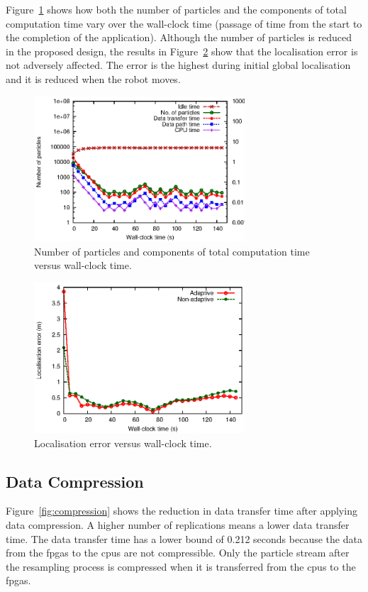 Figure~\ref{fig:adaptive} shows how both the number of particles and the components of total computation time vary over the wall-clock time (passage of time from the start to the completion of the application).
Although the number of particles is reduced in the proposed design, the results in Figure~\ref{fig:error} show that the localisation error is not adversely affected.
The error is the highest during initial global localisation and it is reduced when the robot moves.

\begin{figure}[t!]
\centering
\includegraphics[width=0.7\textwidth]{4_adaptation/figures/fig_adaptive}
\caption{Number of particles and components of total computation time versus wall-clock time.}
\label{fig:adaptive}
\end{figure}

\begin{figure}[t!]
\centering
\includegraphics[width=0.7\textwidth]{4_adaptation/figures/fig_error}
\caption{Localisation error versus wall-clock time.}
\label{fig:error}
\end{figure}

\subsection{Data Compression}
Figure~\ref{fig:compression} shows the reduction in data transfer time after applying data compression.
A higher number of replications means a lower data transfer time.
The data transfer time has a lower bound of 0.212 seconds because the data from the \glspl{fpga} to the \glspl{cpu} are not compressible.
Only the particle stream after the resampling process is compressed when it is transferred from the \glspl{cpu} to the \glspl{fpga}.

